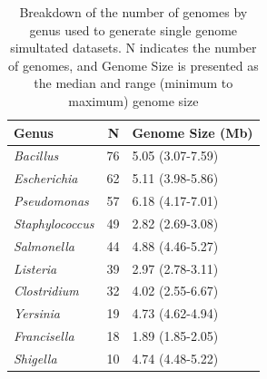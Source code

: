 \documentclass[fleqn,10pt,lineno]{wlpeerj}\usepackage[]{graphicx}\usepackage[]{color}
\begin{document}
\begin{table}[ht]
\centering
\begin{tabular}{lrl}
  \hline
Genus & N & Genome Size (Mb) \\ 
  \hline
\textit{Bacillus} &  76 & 5.05 (3.07-7.59) \\ 
  \textit{Escherichia} &  62 & 5.11 (3.98-5.86) \\ 
  \textit{Pseudomonas} &  57 & 6.18 (4.17-7.01) \\ 
  \textit{Staphylococcus} &  49 & 2.82 (2.69-3.08) \\ 
  \textit{Salmonella} &  44 & 4.88 (4.46-5.27) \\ 
  \textit{Listeria} &  39 & 2.97 (2.78-3.11) \\ 
  \textit{Clostridium} &  32 & 4.02 (2.55-6.67) \\ 
  \textit{Yersinia} &  19 & 4.73 (4.62-4.94) \\ 
  \textit{Francisella} &  18 & 1.89 (1.85-2.05) \\ 
  \textit{Shigella} &  10 & 4.74 (4.48-5.22) \\ 
   \hline
\end{tabular}
\caption{Breakdown of the number of genomes by genus used to generate single genome simultated datasets. N indicates the number of genomes, and Genome Size is presented as the median and range (minimum to maximum) genome size} 
\label{tab:single_org}
\end{table}
\end{document}
